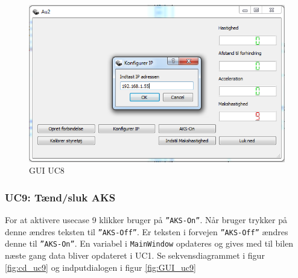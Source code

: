 \begin{figure}[H]
\centering
\includegraphics[width=\textwidth* 3/4,height=\textwidth* 9/20 ]{../fig/billeder/gui_uc8.png}
\caption{GUI UC8}
\label{fig:GUI_uc8}
\end{figure}

\subsubsection{UC9: Tænd/sluk AKS}
For at aktivere usecase 9 klikker bruger på \texttt{''AKS-On''}.
Når bruger trykker på denne ændres teksten til \texttt{''AKS-Off''}. Er teksten i forvejen \texttt{''AKS-Off''} ændres denne til \texttt{''AKS-On''}. En variabel i \texttt{MainWindow} opdateres og gives med til bilen næste gang data bliver opdateret i UC1. Se sekvensdiagrammet i figur \ref{fig:cd_uc9} og indputdialogen i figur \ref{fig:GUI_uc9}

